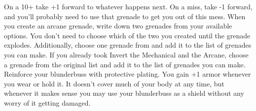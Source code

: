 \documentclass[darkmode]{dw_playbook}
\begin{document}
{{            \gapSm
            \gapSm
            \gap
            On a 10+ take +1 forward to whatever happens next.  On a miss, take -1 forward, and you’ll probably need to use that grenade to get you out of this mess.}
        \gap
            {When you create an arcane grenade, write down two grenades from your available options.  You don’t need to choose which of the two you created until the grenade explodes.
            \gap
            Additionally, choose one grenade from  and add it to the list of grenades you can make.  If you already took Invert the Mechanical and the Arcane, choose a grenade from the original list and add it to the list of grenades you can make.}
        \gap
            {
            Reinforce your blunderbuss with protective plating.  You gain +1 armor whenever you wear or hold it.  It doesn’t cover much of your body at any time, but whenever it makes sense you may use your blunderbuss as a shield without any worry of it getting damaged.}
    }
    {
        ~
    }




\clearpage
~

\resourceLinks
    {
    }
\end{document}
